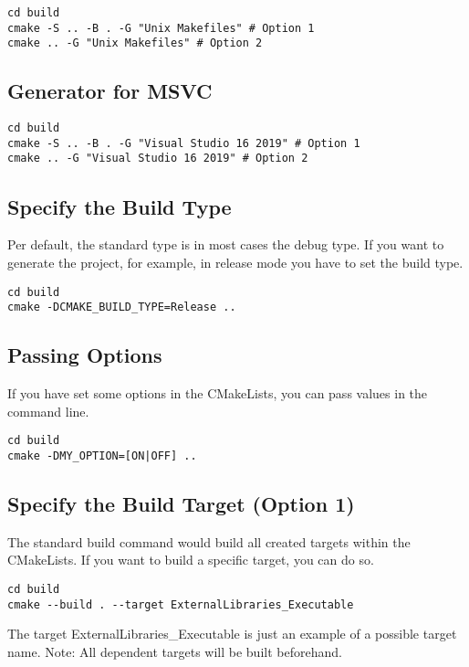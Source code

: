 \begin{verbatim}
cd build
cmake -S .. -B . -G "Unix Makefiles" # Option 1
cmake .. -G "Unix Makefiles" # Option 2
\end{verbatim}

\subsection{Generator for MSVC}

\begin{verbatim}
cd build
cmake -S .. -B . -G "Visual Studio 16 2019" # Option 1
cmake .. -G "Visual Studio 16 2019" # Option 2
\end{verbatim}

\subsection{Specify the Build Type}

Per default, the standard type is in most cases the debug type.
If you want to generate the project, for example, in release mode you have to set the build type.

\begin{verbatim}
cd build
cmake -DCMAKE_BUILD_TYPE=Release ..
\end{verbatim}

\subsection{Passing Options}

If you have set some options in the CMakeLists, you can pass values in the command line.

\begin{verbatim}
cd build
cmake -DMY_OPTION=[ON|OFF] ..
\end{verbatim}

\subsection{Specify the Build Target (Option 1)}

The standard build command would build all created targets within the CMakeLists.
If you want to build a specific target, you can do so.

\begin{verbatim}
cd build
cmake --build . --target ExternalLibraries_Executable
\end{verbatim}

The target ExternalLibraries\_Executable is just an example of a possible target name.
Note: All dependent targets will be built beforehand.

